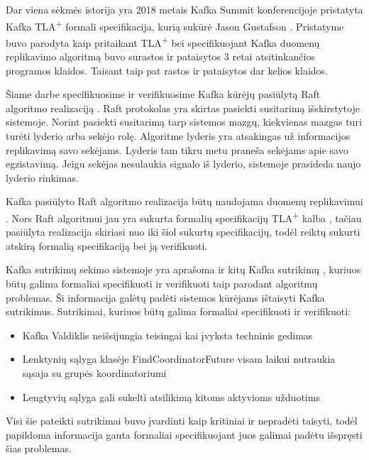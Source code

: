 \documentclass{VUMIFPSmagistrinis}
\begin{document}
		Dar viena sėkmės istorija yra 2018 metais Kafka Summit konferencijoje pristatyta Kafka TLA\textsuperscript{+} formali specifikacija, kurią sukūrė Jason Gustafson \cite{kfkTla}.
		Pristatyme buvo parodyta kaip pritaikant TLA\textsuperscript{+} bei specifikuojant Kafka duomenų replikavimo algoritmą buvo surastos ir pataisytos 3 retai atsitinkančios programos klaidos.
		Taisant taip pat rastos ir pataisytos dar kelios klaidos.


		Šiame darbe specifikuosime ir verifikuosime Kafka kūrėjų pasiūlytą Raft algoritmo \cite{10.1145/2723872.2723876} realizaciją \cite{raftimpl}.
		Raft protokolas yra skirtas pasiekti susitarimą išskirstytoje sistemoje.
		Norint pasiekti susitarimą tarp sistemos mazgų, kiekvienas mazgas turi turėti lyderio arba sekėjo rolę.
		Algoritme lyderis yra atsakingas už informacijos replikavimą savo sekėjams.
		Lyderis tam tikru metu praneša sekėjams apie savo egzistavimą.
		Jeigu sekėjas nesulaukia signalo iš lyderio, sistemoje prasideda naujo lyderio rinkimas.
		
		
		Kafka pasiūlyto Raft algoritmo realizacija būtų naudojama duomenų replikavimui \cite{raftimpl}.
		Nors Raft algoritmui jau yra sukurta formalių specifikacijų TLA\textsuperscript{+} kalba \cite{rafttla}, tačiau pasiūlyta realizacija skiriasi nuo iki šiol sukurtų specifikacijų, todėl reiktų sukurti atskirą formalią specifikaciją bei ją verifikuoti.


		Kafka sutrikimų sekimo sistemoje yra aprašoma ir kitų Kafka sutrikimų \cite{kfkis} , kuriuos būtų galima formaliai specifikuoti ir verifikuoti taip parodant algoritmų problemas.
		Ši informacija galėtų padėti sistemos kūrėjams ištaisyti Kafka sutrikimus.
		Sutrikimai, kuriuos būtų galima formaliai specifikuoti ir verifikuoti:
		\begin{itemize}
			\item{Kafka Valdiklis neišsijungia teisingai kai įvyksta techninis gedimas \cite{kfkBug}}
			\item{Lenktynių sąlyga klasėje FindCoordinatorFuture visam laikui nutraukia sąsaja su grupės koordinatoriumi \cite{kfkistwo}}
			\item{Lengtyvių sąlyga gali sukelti atsilikimą kitoms aktyvioms užduotims \cite{kfkisthr}}
		\end{itemize}
		Visi šie pateikti sutrikimai buvo įvardinti kaip kritiniai ir nepradėti taisyti, todėl papildoma informacija gauta formaliai specifikuojant juos galimai padėtu išspręsti šias problemas.
\end{document}
